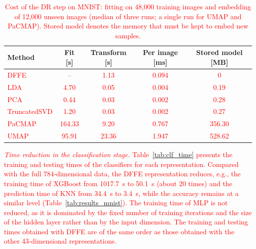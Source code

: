 \documentclass[a4paper,fleqn]{cas-dc}
\begin{document}
\begin{table}
    \centering
    \caption{\textcolor{red}{Cost of the DR step on MNIST: fitting on 48{,}000 training images and embedding of 12{,}000 unseen images (median of three runs; a single run for UMAP and PaCMAP). Stored model denotes the memory that must be kept to embed new samples.}}
    \label{tab:dr_cost}
    \begin{tabular}{l|cccc}
        \hline
        \textbf{Method} & \textbf{Fit [s]} & \textbf{Transform [s]} & \textbf{Per image [ms]} & \textbf{Stored model [MB]} \\
        \hline
        \textcolor{red}{DFFE}         & \textcolor{red}{--}     & \textcolor{red}{1.13}  & \textcolor{red}{0.094} & \textcolor{red}{0} \\
        \textcolor{red}{LDA}          & \textcolor{red}{4.70}   & \textcolor{red}{0.05}  & \textcolor{red}{0.004} & \textcolor{red}{0.19} \\
        \textcolor{red}{PCA}          & \textcolor{red}{0.44}   & \textcolor{red}{0.03}  & \textcolor{red}{0.002} & \textcolor{red}{0.28} \\
        \textcolor{red}{TruncatedSVD} & \textcolor{red}{1.20}   & \textcolor{red}{0.03}  & \textcolor{red}{0.002} & \textcolor{red}{0.27} \\
        \textcolor{red}{PaCMAP}       & \textcolor{red}{164.33} & \textcolor{red}{9.20}  & \textcolor{red}{0.767} & \textcolor{red}{356.30} \\
        \textcolor{red}{UMAP}         & \textcolor{red}{95.91}  & \textcolor{red}{23.36} & \textcolor{red}{1.947} & \textcolor{red}{528.62} \\
        \hline
    \end{tabular}
\end{table}

\textcolor{red}{\textit{Time reduction in the classification stage.} Table~\ref{tab:clf_time} presents the training and testing times of the classifiers for each representation. Compared with the full 784-dimensional data, the DFFE representation reduces, e.g., the training time of XGBoost from 1017.7~s to 50.1~s (about 20 times) and the prediction time of KNN from 34.4~s to 3.4~s, while the accuracy remains at a similar level (Table~\ref{tab:results_mnist}). The training time of MLP is not reduced, as it is dominated by the fixed number of training iterations and the size of the hidden layer rather than by the input dimension. The training and testing times obtained with DFFE are of the same order as those obtained with the other 43-dimensional representations.}
\end{document}
